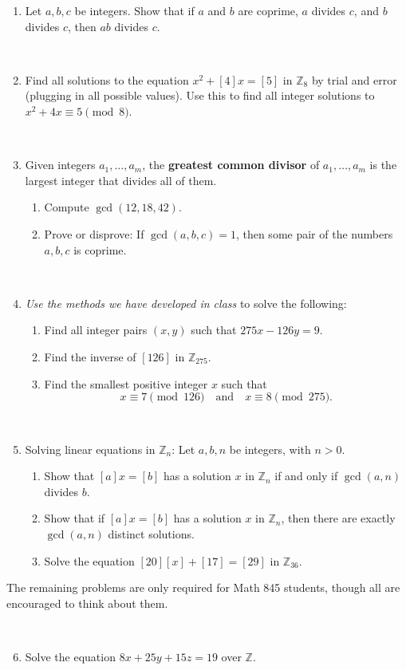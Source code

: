 \documentclass{amsart}
\def\Z{\mathbb Z}
\begin{document}
\begin{enumerate}

\item Let $a,b,c$ be integers. Show that if $a$ and $b$ are coprime, $a$ divides $c$, and $b$ divides $c$, then $ab$ divides $c$.


\

\item Find all solutions to the equation $x^2 + [4]x = [5]$ in $\Z_8$ by trial and error (plugging in all possible values). Use this to find all integer solutions to $x^2+ 4x \equiv 5 \pmod 8$.

\

\item  Given integers $a_1,\dots,a_m$, the \textbf{greatest common divisor} of $a_1,\dots,a_m$ is the largest integer that divides all of them. 
\begin{enumerate}
\item Compute $\gcd(12,18,42)$.
\item Prove or disprove: If $\gcd(a,b,c) = 1$, then some pair of the numbers $a,b,c$ is coprime.
\end{enumerate}

\

\item \emph{Use the methods we have developed in class} to solve the following:
\begin{enumerate}
\item Find all integer pairs $(x,y)$ such that $275x-126y=9$.
\item Find the inverse of $[126]$ in $\Z_{275}$.
\item Find the smallest positive integer $x$ such that 
\[ x\equiv 7 \pmod{126} \quad\text{and}\quad x\equiv 8 \pmod{275}.\]
\end{enumerate}

\

\item  Solving linear equations in $\Z_n$: Let $a,b,n$ be integers, with $n>0$.
\begin{enumerate}
\item Show that $[a] x = [b]$ has a solution $x$ in $\Z_n$ if and only if $\gcd(a,n)$ divides $b$.
\item Show that if $[a] x = [b]$ has a solution $x$ in $\Z_n$, then there are exactly $\gcd(a,n)$ distinct solutions.
\item Solve the equation $[20] [x] + [17] = [29]$ in $\Z_{36}$.
\end{enumerate}


\end{enumerate}

\noindent  \hrulefill

\noindent The remaining problems are only required for Math 845 students, though all are encouraged to think about them.

\

\begin{enumerate}\setcounter{enumi}{5}



\item Solve the equation $8x + 25y + 15z = 19$ over $\Z$.


\end{enumerate}
\end{document}
